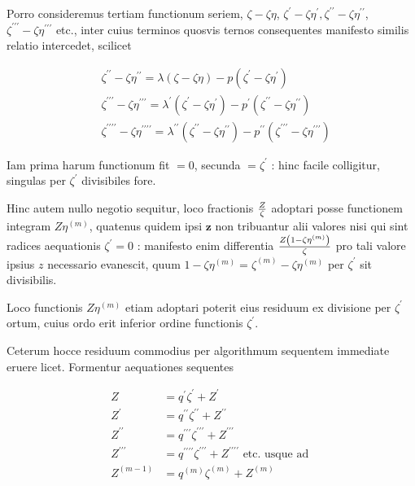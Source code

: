 \documentclass[twoside,12pt, showframe]{memoir}
\let\oldfrac\frac
\def\frac#1#2{\mathchoice{\tfrac{#1}{#2}}{\oldfrac{#1}{#2}}{\genfrac{}{}{}{2}{#1}{#2\mathstrut}}{\genfrac{}{}{}{3}{#1}{#2\mathstrut}}}
\begin{document}
Porro consideremus tertiam functionum seriem, \(\zeta-\zeta \eta\), \(\zeta^{\prime}-\zeta \eta^{\prime}, \zeta^{\prime \prime}-\zeta \eta^{\prime \prime}\), \(\zeta^{\prime \prime \prime}-\zeta \eta^{\prime \prime \prime}\) etc., inter cuius terminos quosvis ternos consequentes manifesto similis relatio intercedet, scilicet

\[
\begin{aligned}
& \zeta^{\prime \prime}-\zeta \eta^{\prime \prime}=\lambda(\zeta-\zeta \eta)-p\left(\zeta^{\prime}-\zeta \eta^{\prime}\right) \\
& \zeta^{\prime \prime \prime}-\zeta \eta^{\prime \prime \prime}=\lambda^{\prime}\left(\zeta^{\prime}-\zeta \eta^{\prime}\right)-p^{\prime}\left(\zeta^{\prime \prime}-\zeta \eta^{\prime \prime}\right) \\
& \zeta^{\prime \prime \prime \prime}-\zeta \eta^{\prime \prime \prime \prime}=\lambda^{\prime \prime}\left(\zeta^{\prime \prime}-\zeta \eta^{\prime \prime}\right)-p^{\prime \prime}\left(\zeta^{\prime \prime \prime}-\zeta \eta^{\prime \prime \prime}\right)
\end{aligned}
\]

Iam prima harum functionum fit \(=0\), secunda \(=\zeta^{\prime}\) : hinc facile colligitur, singulas per \(\zeta^{\prime}\) divisibiles fore.

Hinc autem nullo negotio sequitur, loco fractionis \(\frac{Z}{\zeta}\) adoptari posse functionem integram \(Z \eta^{(m)}\), quatenus quidem ipsi \(\boldsymbol{z}\) non tribuantur alii valores nisi qui sint radices aequationis \(\zeta^{\prime}=0\) : manifesto enim differentia \(\frac{Z\left(1-\zeta \eta^{(m)}\right)}{\zeta}\) pro tali valore ipsius \(z\) necessario evanescit, quum \(1-\zeta \eta^{(m)}=\zeta^{(m)}-\zeta \eta^{(m)}\) per \(\zeta^{\prime}\) sit divisibilis.

Loco functionis \(Z \eta^{(m)}\) etiam adoptari poterit eius residuum ex divisione per \(\zeta^{\prime}\) ortum, cuius ordo erit inferior ordine functionis \(\zeta^{\prime}\).

Ceterum hocce residuum commodius per algorithmum sequentem immediate eruere licet. Formentur aequationes sequentes

\[
\begin{aligned}
Z & =q^{\prime} \zeta^{\prime}+Z^{\prime} \\
Z^{\prime} & =q^{\prime \prime} \zeta^{\prime \prime}+Z^{\prime \prime} \\
Z^{\prime \prime} & =q^{\prime \prime \prime} \zeta^{\prime \prime \prime}+Z^{\prime \prime \prime} \\
Z^{\prime \prime \prime} & =q^{\prime \prime \prime \prime} \zeta^{\prime \prime \prime}+Z^{\prime \prime \prime \prime} \text { etc. usque ad } \\
Z^{(m-1)} & =q^{(m)} \zeta^{(m)}+Z^{(m)}
\end{aligned}
\]
\end{document}
